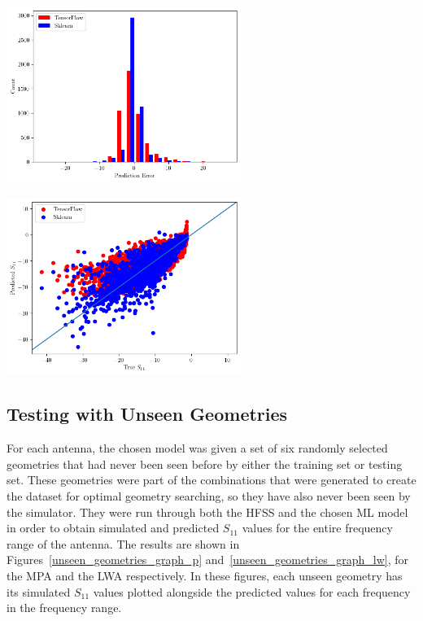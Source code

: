 \documentclass[conference]{IEEEtran}
\newenvironment{Figure}
    {\par\medskip\noindent\minipage{\linewidth}}
    {\endminipage\par\medskip}
\begin{document}
\begin{Figure}
    \centering
    \includegraphics[width=3in]{histogram_leaky_wave}
    \label{histogram_of_error_leaky_wave}
\end{Figure}

\begin{Figure}
    \centering
    \includegraphics[width=3in]{actual_vs_predicted_s11_leaky_wave}
    \label{actual_vs_predicted_s11_leaky_wave}
\end{Figure}

\subsection{Testing with Unseen Geometries}
For each antenna, the chosen model was given a set of six randomly selected geometries that had never been seen before by either the training set or testing set. These geometries were part of the combinations that were generated to create the dataset for optimal geometry searching, so they have also never been seen by the simulator. They were run through both the HFSS and the chosen ML model in order to obtain simulated and predicted $S_{11}$ values for the entire frequency range of the antenna. The results are shown in Figures~\ref{unseen_geometries_graph_p} and~\ref{unseen_geometries_graph_lw}, for the MPA and the LWA respectively. In these figures, each unseen geometry has its simulated $S_{11}$ values plotted alongside the predicted values for each frequency in the frequency range.
\end{document}

